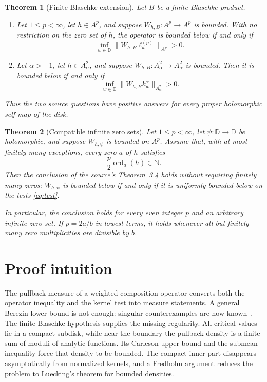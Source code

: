 \documentclass[11pt]{article}
\newtheorem{theorem}{Theorem}
\newcommand{\D}{\mathbb D}
\begin{document}
\begin{theorem}[Finite-Blaschke extension]\label{thm:blaschke}
Let $B$ be a finite Blaschke product.
\begin{enumerate}
\item Let $1\le p<\infty$, let $h\in A^p$, and suppose
      $W_{h,B}:A^p\to A^p$ is bounded.  With no restriction on the zero set
      of $h$, the operator is bounded below if and only if
      \[
      \inf_{w\in\D}\|W_{h,B}\ell_w^{(p)}\|_{A^p}>0.
      \]
\item Let $\alpha>-1$, let $h\in A^2_\alpha$, and suppose
      $W_{h,B}:A^2_\alpha\to A^2_\alpha$ is bounded.  Then it is bounded
      below if and only if
      \[
      \inf_{w\in\D}\|W_{h,B}k_w^\alpha\|_{A^2_\alpha}>0.
      \]
\end{enumerate}
Thus the two source questions have positive answers for every proper
holomorphic self-map of the disk.
\end{theorem}

\begin{theorem}[Compatible infinite zero sets]\label{thm:orders}
Let $1\le p<\infty$, let $\psi:\D\to\D$ be holomorphic, and suppose
$W_{h,\psi}$ is bounded on $A^p$.  Assume that, with at most finitely many
exceptions, every zero $a$ of $h$ satisfies
\begin{equation}\label{eq:order}
 \frac p2\operatorname{ord}_a(h)\in\mathbb N.
\end{equation}
Then the conclusion of the source's Theorem~3.4 holds without requiring
finitely many zeros: $W_{h,\psi}$ is bounded below if and only if it is
uniformly bounded below on the tests \eqref{eq:test}.

In particular, the conclusion holds for every even integer $p$ and an
arbitrary infinite zero set.  If $p=2a/b$ in lowest terms, it holds whenever
all but finitely many zero multiplicities are divisible by $b$.
\end{theorem}

\section{Proof intuition}

The pullback measure of a weighted composition operator converts both the
operator inequality and the kernel test into measure statements.  A general
Berezin lower bound is not enough: singular counterexamples are now
known~\cite{CLZ}.  The finite-Blaschke hypothesis supplies the missing
regularity.  All critical values lie in a compact subdisk, while near the
boundary the pullback density is a finite sum of moduli of analytic functions.
Its Carleson upper bound and the submean inequality force that density to be
bounded.  The compact inner part disappears asymptotically from normalized
kernels, and a Fredholm argument reduces the problem to Luecking's theorem
for bounded densities.
\end{document}
